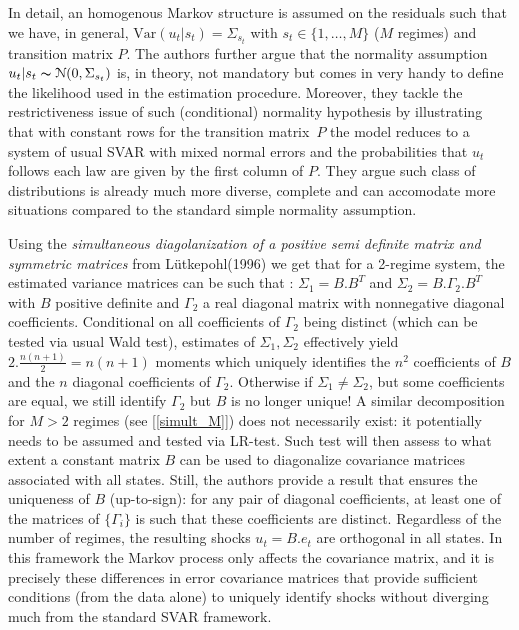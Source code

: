 \bigbreak

In detail, an homogenous Markov structure is assumed on the residuals such that we have, in general, $\textrm{Var}(u_t \vert s_t) = \Sigma_{s_t}$ with $s_t \in \{1,\dots,M \}$ ($M$ regimes) and transition matrix $P$. 
The authors further argue that the normality assumption $u_t \vert s_t \thicksim \mathcal{N}(0,\Sigma_{s_t})$ is, in theory, not mandatory but comes in very handy to define the likelihood used in the estimation procedure. 
Moreover, they tackle the restrictiveness issue of such (conditional) normality hypothesis by illustrating that with constant rows for the transition matrix\footnotemark \, $P$ the model reduces to a system of usual SVAR with mixed normal errors and the probabilities that $u_t$ follows each law are given by the first column of $P$.
They argue such class of distributions is already much more diverse, complete and can accomodate more situations compared to the standard simple normality assumption. 

\bigbreak

Using the \textit{simultaneous diagolanization of a positive semi definite matrix and symmetric matrices} from Lütkepohl\footnotemark (1996) we get that for a 2-regime system, the estimated variance matrices can be such that : $\Sigma_1 = B.B^T$ and $\Sigma_2 = B.\Gamma_2.B^T$ with $B$ positive definite and $\Gamma_2$ a real diagonal matrix with nonnegative diagonal coefficients.
Conditional on all coefficients of $\Gamma_2$ being distinct (which can be tested via usual Wald test), estimates of $\Sigma_1, \Sigma_2$ effectively yield $2.\frac{n(n+1)}{2}=n(n+1)$ moments which uniquely identifies the $n^2$ coefficients of $B$ and the $n$ diagonal coefficients of $\Gamma_2$.
Otherwise if $\Sigma_1 \neq \Sigma_2$, but some coefficients are equal, we still identify $\Gamma_2$ but $B$ is no longer unique!
A similar decomposition for $M>2$ regimes (see [\ref{simult_M}]) does not necessarily exist: it potentially needs to be assumed and tested via LR-test. 
Such test will then assess to what extent a constant matrix $B$ can be used to diagonalize covariance matrices associated with all states.
Still, the authors provide a result that ensures the uniqueness of $B$ (up-to-sign): for any pair of diagonal coefficients, at least one of the matrices of $\{\Gamma_i\}$ is such that these coefficients are distinct.
Regardless of the number of regimes, the resulting shocks $u_t = B.e_t$ are orthogonal in all states.
In this framework the Markov process only affects the covariance matrix, and it is precisely these differences in error covariance matrices that provide sufficient conditions (from the data alone) to uniquely identify shocks without diverging much from the standard SVAR framework.


